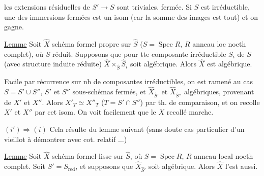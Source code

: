 les extensions résiduelles de $S'\longrightarrow S$ sont triviales.    fermée. Si $S$ est irréductible, une des immersions fermées  est un isom (car la somme des images est tout) et on gagne.  


\uline{Lemme} Soit $\widehat X$ schéma formel propre sur $\widehat S$ ($S=\operatorname{Spec}R$, $R$ anneau loc noeth complet), où $S$ réduit. Supposons que pour tte composante irréductible $S_i$ de $S$ (avec structure induite réduite) $\widehat X\times_{\widehat S}\widehat S_i$ soit algébrique. Alors $\widehat X$ est algébrique.

Facile par récurrence sur nb de composantes irréductibles, on est ramené au cas $S=S'\cup S''$, $S'$ et $S''$ sous-schémas fermés, et $\widehat X_{\widehat S'}$ et $\widehat X_{\widehat S''}$  algébriques, provenant de $X'$ et $X''$. Alors $X'_T\simeq X''_T$ ($T=S'\cap S''$) par th. de comparaison, et on recolle $X'$ et $X''$ par cet isom. On voit facilement que le $X$ recollé marche.

$(i')\Longrightarrow(i)$ Cela résulte du lemme suivant (sans doute cas particulier d'un  vieillot à démontrer avec  cot. relatif $\ldots$)

\uline{Lemme} Soit $\widehat X$ schéma formel  lisse sur $\widehat S$, où $S=\operatorname{Spec}R$, $R$ anneau local noeth complet. Soit $S'=S_{\mathrm{red}}$, et supposons que $\widehat X_{\widehat S'}$ soit algébrique. Alors $\widehat X$ l'est aussi.

